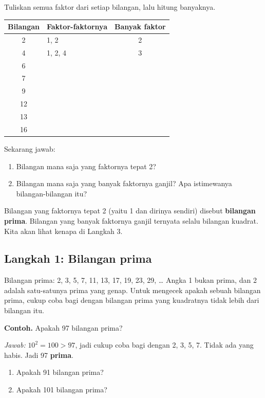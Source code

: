 \documentclass[11pt,a4paper]{article}
\begin{document}
\begin{selidiki}
Tuliskan semua faktor dari setiap bilangan, lalu hitung banyaknya.

\begin{center}
\renewcommand{\arraystretch}{1.5}
\begin{tabular}{|c|p{5cm}|c|}
\hline
Bilangan & Faktor-faktornya & Banyak faktor\\ \hline
2 & 1, 2 & 2\\ \hline
4 & 1, 2, 4 & 3\\ \hline
6 & & \\ \hline
7 & & \\ \hline
9 & & \\ \hline
12 & & \\ \hline
13 & & \\ \hline
16 & & \\ \hline
\end{tabular}
\end{center}

Sekarang jawab:
\begin{enumerate}
    \item Bilangan mana saja yang faktornya tepat 2?
    \item Bilangan mana saja yang banyak faktornya ganjil? Apa istimewanya bilangan-bilangan itu?
\end{enumerate}

Bilangan yang faktornya tepat 2 (yaitu 1 dan dirinya sendiri) disebut \textbf{bilangan prima}.
Bilangan yang banyak faktornya ganjil ternyata selalu bilangan kuadrat. Kita akan lihat
kenapa di Langkah 3.
\end{selidiki}

\subsection*{Langkah 1: Bilangan prima}
Bilangan prima: 2, 3, 5, 7, 11, 13, 17, 19, 23, 29, \dots{} Angka 1 bukan prima, dan 2 adalah
satu-satunya prima yang genap. Untuk mengecek apakah sebuah bilangan prima, cukup coba bagi
dengan bilangan prima yang kuadratnya tidak lebih dari bilangan itu.

\begin{contoh}
\textbf{Contoh.} Apakah 97 bilangan prima?

\textit{Jawab:} $10^2 = 100 > 97$, jadi cukup coba bagi dengan 2, 3, 5, 7. Tidak ada yang habis.
Jadi 97 \textbf{prima}.
\end{contoh}

\begin{giliranmu}
\begin{enumerate}[label=\alph*.]
    \item Apakah 91 bilangan prima? \kosong
    \item Apakah 101 bilangan prima? \kosong
\end{enumerate}
\end{giliranmu}
\end{document}
